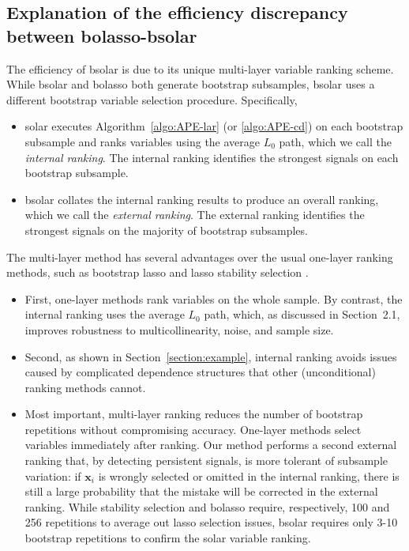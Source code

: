 \documentclass[11pt,review,authoryear]{elsarticle}
\begin{document}
\subsection{Explanation of the efficiency discrepancy between bolasso-bsolar}

The efficiency of bsolar is due to its unique multi-layer variable ranking scheme. While bsolar and bolasso both generate bootstrap subsamples, bsolar uses a different bootstrap variable selection procedure. Specifically,

\begin{itemize}

  \item     solar executes Algorithm~\ref{algo:APE-lar} (or \ref{algo:APE-cd}) on each bootstrap subsample and ranks variables using the average $L_0$ path, which we call the \emph{internal ranking}. The internal ranking identifies the strongest signals on each bootstrap subsample.

  \item     bsolar collates the internal ranking results to produce an overall ranking, which we call the \emph{external ranking}. The external ranking identifies the strongest signals on the majority of bootstrap subsamples.
\end{itemize}

The multi-layer method has several advantages over the usual one-layer ranking methods, such as bootstrap lasso and lasso stability selection \citep{fan2008sure, hall2009usingb, hall2009using, li2012robust, li2012feature}.
\begin{itemize}
  \item First, one-layer methods rank variables on the whole sample. By contrast, the internal ranking uses the average $L_0$ path, which, as discussed in Section~2.1, improves robustness to multicollinearity, noise, and sample size.
  \item Second, as shown in Section~\ref{section:example}, internal ranking avoids issues caused by complicated dependence structures that other (unconditional) ranking methods cannot.
  \item Most important, multi-layer ranking reduces the number of bootstrap repetitions without compromising accuracy. One-layer methods select variables immediately after ranking. Our method performs a second external ranking that, by detecting persistent signals, is more tolerant of subsample variation: if $\mathbf{x}_i$ is wrongly selected or omitted in the internal ranking, there is still a large probability that the mistake will be corrected in the external ranking. While stability selection and bolasso require, respectively, 100 and 256 repetitions to average out lasso selection issues, bsolar requires only 3-10 bootstrap repetitions to confirm the solar variable ranking.
\end{itemize}
\end{document}
